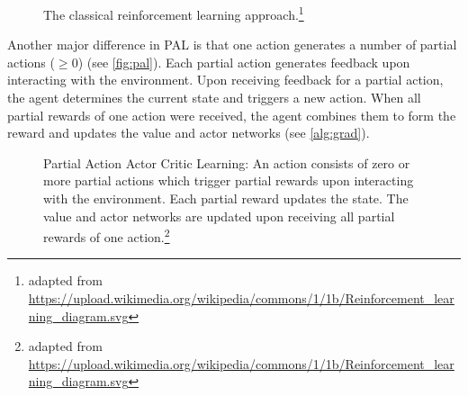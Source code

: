 \documentclass[sigconf]{acmart}
\begin{document}
\begin{figure}
\begin{minipage}{\columnwidth}

\caption{The classical reinforcement learning approach.\protect\footnote{adapted from \url{https://upload.wikimedia.org/wikipedia/commons/1/1b/Reinforcement_learning_diagram.svg}}}
\label{fig:reinforcement}
\end{minipage}
\end{figure}

Another major difference in PAL is that one action generates a number of partial actions ($\geq 0$) (see \autoref{fig:pal}). Each partial action generates feedback upon interacting with the environment. Upon receiving feedback for a partial action, the agent determines the current state and triggers a new action. When all partial rewards of one action were received, the agent combines them to form the reward and updates the value and actor networks (see \autoref{alg:grad}).

\begin{figure}
\begin{minipage}{\columnwidth}

\caption{Partial Action Actor Critic Learning: An action consists of zero or more partial actions which trigger partial rewards upon interacting with the environment. Each partial reward updates the state. The value and actor networks are updated upon receiving all partial rewards of one action.\protect\footnote{adapted from \url{https://upload.wikimedia.org/wikipedia/commons/1/1b/Reinforcement_learning_diagram.svg}}}
\label{fig:pal}
\end{minipage}
\end{figure}
\end{document}
